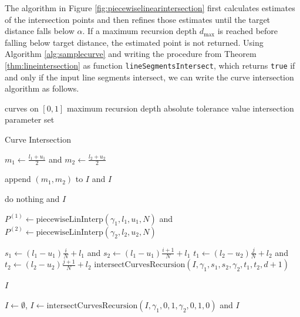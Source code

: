 \documentclass[a4paper, 11pt]{report}
\theoremstyle{definition}
\newcommand{\Desc}[2]{\State \makebox[12em][l]{#1}#2}
\begin{document}
	The algorithm in Figure \ref{fig:piecewiselinearintersection} first calculates estimates of the intersection points and then refines those estimates until the target distance falls below $\alpha$. If a maximum recursion depth $d_{\max}$ is reached before falling below target distance, the estimated point is not returned. Using Algorithm \ref{alg:samplecurve} and writing the procedure from Theorem \ref{thm:lineintersection} as function \texttt{lineSegmentsIntersect}, which returns \texttt{true} if and only if the input line segments intersect, we can write the curve intersection algorithm as follows.

	\begin{algorithm}[H]
		\begin{algorithmic}[1]
			\Input
				\Desc{$\gamma_1, \gamma_2$}{curves on $[0,1]$}
				\Desc{$d_{\max}$}{maximum recursion depth}
				\Desc{$\alpha$}{absolute tolerance value}
			\EndInput
			\Output
				\Desc{$I(\gamma_1, \gamma_2)$}{intersection parameter set}
			\EndOutput

			\caption{Curve Intersection}\label{alg:curveintersection}
				\State $m_1 \gets \frac{l_1 + u_1}{2}$ and $m_2 \gets \frac{l_2 + u_2}{2}$
				
				 append $(m_1, m_2)$ to $I$ and \Return $I$
				\EndIf

				 do nothing and \Return $I$
				\EndIf

				\State $P^{(1)} \gets \text{piecewiseLinInterp}(\gamma_1, l_1, u_1, N)$ and $P^{(2)} \gets \text{piecewiseLinInterp}(\gamma_2, l_2, u_2, N)$
				

							\State $s_1 \gets (l_1 - u_1) \frac{i}{N} + l_1$ and $s_2 \gets (l_1 - u_1) \frac{i+1}{N} + l_1$
							\State $t_1 \gets (l_2 - u_2) \frac{j}{N} + l_2$ and $t_2 \gets (l_2 - u_2) \frac{j+1}{N} + l_2$
							\State $\text{intersectCurvesRecursion}(I, \gamma_1, s_1, s_2, \gamma_2, t_1, t_2, d+1)$
						\EndIf
					\EndFor
				\EndFor

				\State \Return $I$
			\EndProcedure

				\State $I \gets \emptyset$, $I \gets \text{intersectCurvesRecursion}(I, \gamma_1, 0, 1, \gamma_2, 0, 1, 0)$ and \Return $I$
			\EndProcedure
		\end{algorithmic}
	\end{algorithm}
\end{document}
